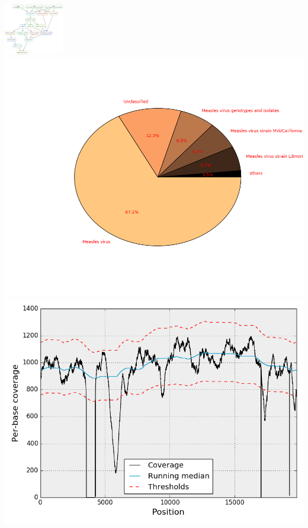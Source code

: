 \documentclass{beamer}
\begin{document}
\begin{frame}
\begin{columns}
\begin{column}{0.5\textwidth}
 \includegraphics[scale=0.14, height=6em]{pipeline}
  \includegraphics[scale=0.14]{kraken}\\
  \includegraphics[scale=0.15]{coverage}

\end{column}
\end{columns}
\end{frame}
\end{document}
